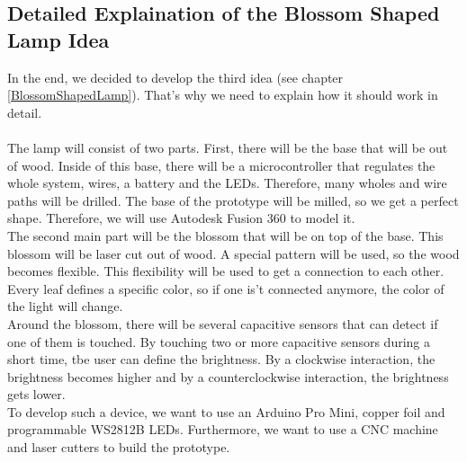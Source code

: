 \documentclass[04_projectProcess.tex]{subfiles}
\begin{document}
    \subsection{Detailed Explaination of the Blossom Shaped Lamp Idea}
        \begin{flushleft}
            In the end, we decided to develop the third idea (see chapter \ref{BlossomShapedLamp}). 
            That's why we need to explain how it should work in detail. \\~\\

            The lamp will consist of two parts. First, there will be the base that will be out of 
            wood. Inside of this base, there will be a microcontroller that regulates the whole 
            system, wires, a battery and the LEDs. Therefore, many wholes and wire paths will be 
            drilled. The base of the prototype will be milled, so we get a perfect shape. Therefore, 
            we will use Autodesk Fusion 360\cite{autodeskFusion360} to model it.\\

            The second main part will be the blossom that will be on top of the base. This blossom
            will be laser cut out of wood. A special pattern will be used, so the wood becomes flexible.
            This flexibility will be used to get a connection to each other. Every leaf defines a 
            specific color, so if one is't connected anymore, the color of the light will change. \\

            Around the blossom, there will be several capacitive sensors that can detect if one of them 
            is touched. By touching two or more capacitive sensors during a short time, tbe user can 
            define the brightness. By a clockwise interaction, the brightness becomes higher and 
            by a counterclockwise interaction, the brightness gets lower. \\

            To develop such a device, we want to use an Arduino Pro Mini, copper foil and programmable 
            WS2812B LEDs. Furthermore, we want to use a CNC machine and laser cutters to build the 
            prototype.
        \end{flushleft}
\end{document}
